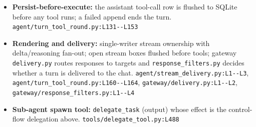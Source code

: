 \begin{itemize}
\item \textbf{Persist-before-execute:} the assistant tool-call row is flushed to SQLite before any tool runs; a failed append ends the turn. \texttt{agent/\allowbreak{}turn\_\allowbreak{}tool\_\allowbreak{}round.\allowbreak{}py:\allowbreak{}L131-\allowbreak{}-\allowbreak{}L153}
\item \textbf{Rendering and delivery:} single-writer stream ownership with delta/reasoning fan-out; open stream boxes flushed before tools; gateway \texttt{delivery.\allowbreak{}py} routes responses to targets and \texttt{response\_\allowbreak{}filters.\allowbreak{}py} decides whether a turn is delivered to the chat. \texttt{agent/\allowbreak{}stream\_\allowbreak{}delivery.\allowbreak{}py:\allowbreak{}L1-\allowbreak{}-\allowbreak{}L3}, \texttt{agent/\allowbreak{}turn\_\allowbreak{}tool\_\allowbreak{}round.\allowbreak{}py:\allowbreak{}L160-\allowbreak{}-\allowbreak{}L164}, \texttt{gateway/\allowbreak{}delivery.\allowbreak{}py:\allowbreak{}L1-\allowbreak{}-\allowbreak{}L2}, \texttt{gateway/\allowbreak{}response\_\allowbreak{}filters.\allowbreak{}py:\allowbreak{}L1-\allowbreak{}-\allowbreak{}L4}
\item \textbf{Sub-agent spawn tool:} \texttt{delegate\_\allowbreak{}task} (output) whose effect is the control-flow delegation above. \texttt{tools/\allowbreak{}delegate\_\allowbreak{}tool.\allowbreak{}py:\allowbreak{}L488}
\end{itemize}

